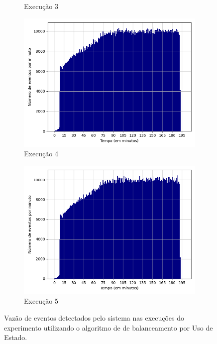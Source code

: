 \begin{figure}[h!]
\begin{subfigure}{.5\textwidth}
  \caption{Execução 3}
  \label{fig:histv-8-dez-su}
\end{subfigure}
\begin{subfigure}{.5\textwidth}
  \centering
  \includegraphics[width=.8\linewidth]{figuras/graphics/histogram_vazao_9-dez-su.png}  
  \caption{Execução 4}
  \label{fig:histv-9-dez-su}
\end{subfigure}
\begin{subfigure}{.5\textwidth}
  \centering
  \includegraphics[width=.8\linewidth]{figuras/graphics/histogram_vazao_10-dez-su.png}  
  \caption{Execução 5}
  \label{fig:histv-10-dez-su}
\end{subfigure}
\caption{Vazão de eventos detectados pelo sistema nas  execuções do experimento utilizando o algoritmo de de balanceamento por Uso de Estado.}
\label{fig:histogram_full_SU}
\end{figure}


